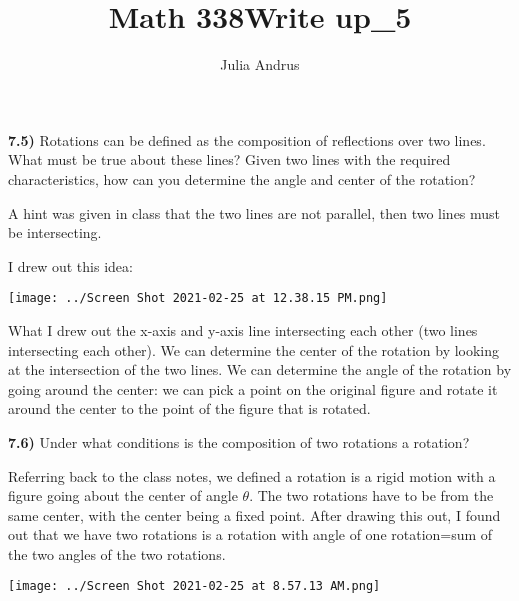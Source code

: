 \documentclass{article}
\title{Math 338\:Write up\_5}
\author{Julia Andrus}
\date{}
\begin{document}
\maketitle
\textbf{7.5)} Rotations can be defined as the composition of reflections over two lines. What must be true about these lines? Given two lines with the required characteristics, how can you determine the angle and center of the rotation?

\vspace{2mm}

A hint was given in class that the two lines are not parallel, then two lines must be intersecting. 

\vspace{2mm}

I drew out this idea:

\vspace{2mm}

\texttt{[image: ../Screen Shot 2021-02-25 at 12.38.15 PM.png]} 

\vspace{2mm}

What I drew out the x-axis and y-axis line intersecting each other (two lines intersecting each other). We can determine the center of the rotation by looking at the intersection of the two lines. We can determine the angle of the rotation by going around the center: we can pick a point on the original figure and rotate it around the center to the point of the figure that is rotated.



\newpage


\textbf{7.6)} Under what conditions is the composition of two rotations a rotation?

\vspace{2mm} 

Referring back to the class notes, we defined a rotation is a rigid motion with a figure going about the center of angle $\theta$. The two rotations have to be from the same center, with the center being a fixed point. After drawing this out, I found out that we have two rotations is a rotation with angle of one rotation=sum of the two angles of the two rotations. 

\vspace{2mm} 


\texttt{[image: ../Screen Shot 2021-02-25 at 8.57.13 AM.png]} 
\end{document}

